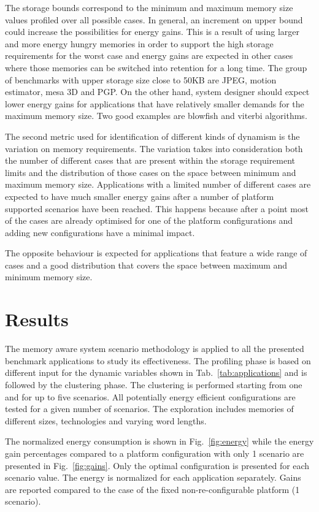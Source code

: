 \documentclass[a4paper,conference]{IEEEtran}
\begin{document}
The storage bounds correspond to the minimum and maximum memory size values profiled over all possible cases. In general, an increment on upper bound could increase the possibilities for energy gains. This is a result of using larger and more energy hungry memories in order to support the high storage requirements for the worst case and energy gains are expected in other cases where those memories can be switched into retention for a long time. The group of benchmarks with upper storage size close to 50KB are JPEG, motion estimator, mesa 3D and PGP. On the other hand, system designer should expect lower energy gains for applications that have relatively smaller demands for the maximum memory size. Two good examples are blowfish and viterbi algorithms. 

The second metric used for identification of different kinds of dynamism is the variation on memory requirements. The variation takes into consideration both the number of different cases that are present within the storage requirement limits and the distribution of those cases on the space between minimum and maximum memory size. Applications with a limited number of different cases are expected to have much smaller energy gains after a number of platform supported scenarios have been reached. This happens because after a point most of the cases are already optimised for one of the platform configurations and adding new configurations have a minimal impact.

The opposite behaviour is expected for applications that feature a wide range of cases and a good distribution that covers the space between maximum and minimum memory size.

\section{Results}
\label{sec:results}

The memory aware system scenario methodology is applied to all the presented benchmark applications to study its effectiveness. The profiling phase is based on different input for the dynamic variables shown in Tab.~\ref{tab:applications} and is followed by the clustering phase. The clustering is performed starting from one and for up to five scenarios. All potentially energy efficient configurations are tested for a given number of scenarios. The exploration includes memories of different sizes, technologies and varying word lengths. 

The normalized energy consumption is shown in Fig.~\ref{fig:energy} while the energy gain percentages compared to a platform configuration with only 1 scenario are presented in Fig.~\ref{fig:gains}. Only the optimal configuration is presented for each scenario value. The energy is normalized for each application separately. Gains are reported compared to the case of the fixed non-re-configurable platform (1 scenario).
\end{document}
